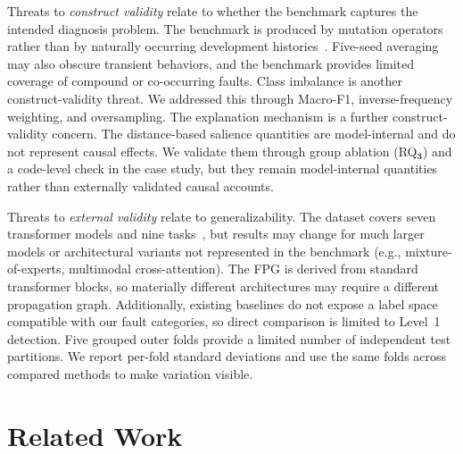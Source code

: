 Threats to \emph{construct validity} relate to whether the benchmark captures the intended diagnosis problem. The benchmark is produced by mutation operators rather than by naturally occurring development histories~\cite{attention_taxonomy,frankenformer}. Five-seed averaging may also obscure transient behaviors, and the benchmark provides limited coverage of compound or co-occurring faults. Class imbalance is another construct-validity threat. We addressed this through Macro-F1, inverse-frequency weighting, and oversampling. The explanation mechanism is a further construct-validity concern. The distance-based salience quantities are model-internal and do not represent causal effects. We validate them through group ablation (RQ$\mathbf{_3}$) and a code-level check in the case study, but they remain model-internal quantities rather than externally validated causal accounts.

Threats to \emph{external validity} relate to generalizability. The dataset covers seven transformer models and nine tasks~\cite{frankenformer}, but results may change for much larger models or architectural variants not represented in the benchmark (e.g., mixture-of-experts, multimodal cross-attention). The FPG is derived from standard transformer blocks, so materially different architectures may require a different propagation graph. Additionally, existing baselines do not expose a label space compatible with our fault categories, so direct comparison is limited to Level~1 detection. Five grouped outer folds provide a limited number of independent test partitions. We report per-fold standard deviations and use the same folds across compared methods to make variation visible.


\section{Related Work}
\label{sec:defaultpp_related}

